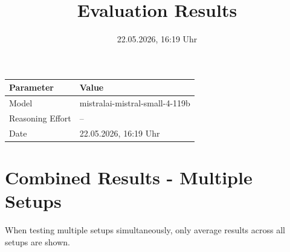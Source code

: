 \documentclass[a4paper,11pt]{article}
\title{Evaluation Results}
\date{22.05.2026, 16:19 Uhr}
\begin{document}
\maketitle

\begin{table}[H]
\centering
\begin{tabular}{l l}
\toprule
\textbf{Parameter} & \textbf{Value} \\
\midrule
Model & mistralai-mistral-small-4-119b \\
Reasoning Effort & -- \\
Date & 22.05.2026, 16:19 Uhr \\
\bottomrule
\end{tabular}
\end{table}

\tableofcontents
\clearpage

\section{Combined Results - Multiple Setups}

When testing multiple setups simultaneously, only average results across all setups are shown.
\end{document}
